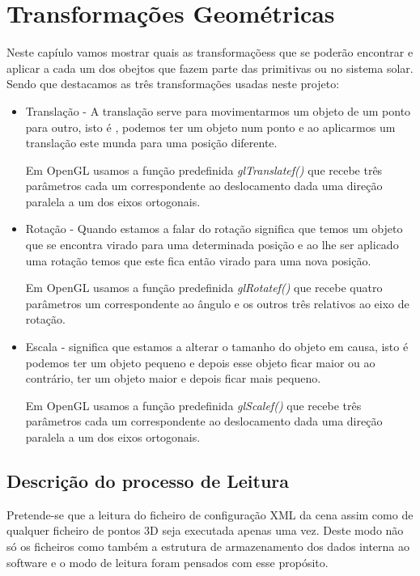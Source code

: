 \chapter{Transformações Geométricas}
Neste capíulo vamos mostrar quais as transformaçõess que se poderão encontrar e aplicar a cada um dos obejtos que fazem parte das primitivas ou no sistema solar.
Sendo que destacamos as três transformações usadas neste projeto: 
\begin{itemize}
\item{Translação} - A translação serve para movimentarmos um objeto de um ponto para outro,
isto é , podemos ter um objeto num ponto e ao aplicarmos um translação este munda para uma posição diferente.

Em OpenGL usamos a função predefinida \textit{glTranslatef()} que recebe três parâmetros cada um correspondente ao deslocamento dada uma direção paralela a um dos eixos ortogonais. 

\item{Rotação} - Quando estamos a falar do rotação significa que temos um objeto que se encontra virado para uma determinada posição e ao lhe ser aplicado uma rotação temos que este fica então virado para uma nova posição. 

Em OpenGL usamos a função predefinida \textit{glRotatef()} que recebe quatro parâmetros um correspondente  ao ângulo e os outros três relativos ao eixo de rotação. 

\item{Escala} - significa que estamos a alterar o tamanho do objeto em causa, isto é  podemos ter um objeto pequeno e depois esse objeto ficar maior ou ao contrário, ter um objeto maior e depois ficar mais pequeno.

Em OpenGL usamos a função predefinida \textit{glScalef()} que recebe três parâmetros cada um correspondente ao deslocamento dada uma direção paralela a um dos eixos ortogonais. 

\end{itemize}


\section{Descrição do processo de Leitura }

	Pretende-se que a leitura do ficheiro de configuração XML da cena assim como de qualquer ficheiro de pontos 3D seja executada apenas uma vez. Deste modo não só os ficheiros como também a estrutura de armazenamento dos dados interna ao software  e o modo de leitura foram pensados com esse propósito. 


